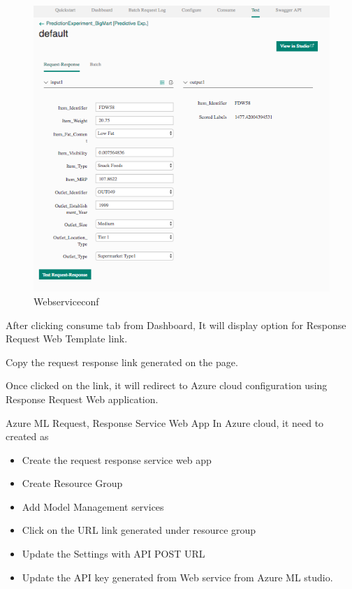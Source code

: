 \begin{figure}[pic7]
	\centering\includegraphics[width=\columnwidth]
{Images/mlstudio/Webserviceconf.png}
	\caption{Webserviceconf}\label{fig:Webserviceconf}
\end{figure}

After clicking consume tab from Dashboard, It will display option for 
Response Request Web Template link.

Copy the request response link generated on the page.

Once clicked on the link, it will redirect to Azure cloud configuration 
using Response Request Web application.

Azure ML Request, Response Service Web App
In Azure cloud, it need to created as

\begin{itemize}
\item Create the request response service web app
\item Create Resource Group
\item Add Model Management services
\item Click on the URL link generated under resource group
\item Update the Settings with API POST URL
\item Update the API key generated from Web service from Azure ML studio.
\end{itemize}

